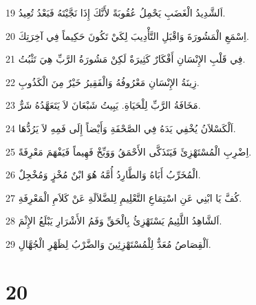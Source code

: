 \par 19 اَلشَّدِيدُ الْغَضَبِ يَحْمِلُ عُقُوبَةً لأَنَّكَ إِذَا نَجَّيْتَهُ فَبَعْدُ تُعِيدُ.
\par 20 اِسْمَعِ الْمَشُورَةَ وَاقْبَلِ التَّأْدِيبَ لِكَيْ تَكُونَ حَكِيماً فِي آخِرَتِكَ.
\par 21 فِي قَلْبِ الإِنْسَانِ أَفْكَارٌ كَثِيرَةٌ لَكِنْ مَشُورَةُ الرَّبِّ هِيَ تَثْبُتُ.
\par 22 زِينَةُ الإِنْسَانِ مَعْرُوفُهُ وَالْفَقِيرُ خَيْرٌ مِنَ الْكَذُوبِ.
\par 23 مَخَافَةُ الرَّبِّ لِلْحَيَاةِ. يَبِيتُ شَبْعَانَ لاَ يَتَعَهَّدُهُ شَرٌّ.
\par 24 اَلْكَسْلاَنُ يُخْفِي يَدَهُ فِي الصَّحْفَةِ وَأَيْضاً إِلَى فَمِهِ لاَ يَرُدُّهَا.
\par 25 اِضْرِبِ الْمُسْتَهْزِئَ فَيَتَذَكَّى الأَحْمَقُ وَوَبِّخْ فَهِيماً فَيَفْهَمَ مَعْرِفَةً.
\par 26 الْمُخَرِّبُ أَبَاهُ وَالطَّارِدُ أُمَّهُ هُوَ ابْنٌ مُخْزٍ وَمُخْجِلٌ.
\par 27 كُفَّ يَا ابْنِي عَنِ اسْتِمَاعِ التَّعْلِيمِ لِلضَّلاَلَةِ عَنْ كَلاَمِ الْمَعْرِفَةِ.
\par 28 اَلشَّاهِدُ اللَّئِيمُ يَسْتَهْزِئُ بِالْحَقِّ وَفَمُ الأَشْرَارِ يَبْلَعُ الإِثْمَ.
\par 29 اَلْقِصَاصُ مُعَدٌّ لِلْمُسْتَهْزِئِينَ وَالضَّرْبُ لِظَهْرِ الْجُهَّالِ.

\chapter{20}


